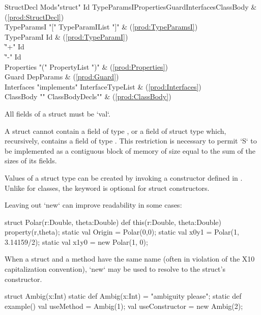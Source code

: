 \begin{bbgrammar}
          StructDecl \: Mods\opt \xcd"struct" Id TypeParamsI\opt Properties\opt Guard\opt Interfaces\opt ClassBody & (\ref{prod:StructDecl}) \\
         TypeParamsI \: \xcd"[" TypeParamIList \xcd"]" & (\ref{prod:TypeParamsI}) \\
          TypeParamI \: Id & (\ref{prod:TypeParamI}) \\
                     \| \xcd"+" Id \\
                     \| \xcd"-" Id \\
          Properties \: \xcd"(" PropertyList \xcd")" & (\ref{prod:Properties}) \\
               Guard \: DepParams & (\ref{prod:Guard}) \\
          Interfaces \: \xcd"implements" InterfaceTypeList & (\ref{prod:Interfaces}) \\
           ClassBody \: \xcd"{" ClassBodyDecls\opt \xcd"}" & (\ref{prod:ClassBody}) \\
\end{bbgrammar}



All fields of a struct must be \xcd`val`.

A struct  cannot contain a field of type , or a field of struct
type  which, recursively, contains a field of type .  This
restriction is necessary to permit \xcd`S` to be implemented as a contiguous
block of memory of size equal to the sum of the sizes of its fields.  


Values of a struct  type can be created by invoking a constructor
defined in .  Unlike for classes, the   keyword is optional
for struct constructors.  

\begin{ex}
Leaving out \xcd`new` can improve readability in some cases: 
\begin{xten}
struct Polar(r:Double, theta:Double){
  def this(r:Double, theta:Double) {property(r,theta);}
  static val Origin = Polar(0,0);
  static val x0y1   = Polar(1, 3.14159/2);
  static val x1y0   = new Polar(1, 0); 
}
\end{xten}
%


When a struct and a method have the same name (often in violation of the X10
capitalization convention), 
\xcd`new` may be used to resolve to the struct's constructor.  
\begin{xten}
struct Ambig(x:Int) {
  static def Ambig(x:Int) = "ambiguity please";
  static def example() { 
    val useMethod      = Ambig(1);
    val useConstructor = new Ambig(2);
  }
}
\end{xten}
%

\end{ex}

